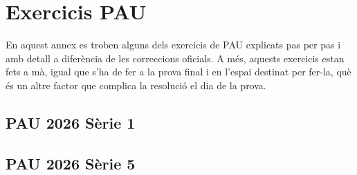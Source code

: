 \chapter{Exercicis PAU}
\label{c:exercicisPAU}
En aquest annex es troben alguns dels exercicis de PAU explicats pas per pas i amb detall a diferència de les correccions oficials. A més, aquests exercicis estan fets a mà, igual que s'ha de fer a la prova final i en l'espai destinat per fer-la, què és un altre factor que complica la resolució el dia de la prova.

\section{PAU 2026 Sèrie 1}

\setlength{\voffset}{0in}






\section{PAU 2026 Sèrie 5}


\setlength{\voffset}{-25mm}
